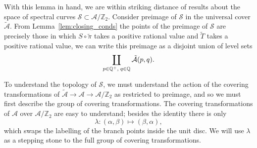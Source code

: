 \documentclass{article}
\begin{document}
With this lemma in hand, we are within striking distance of results about the space of spectral curves $\mathcal{S} \subset \mathcal{A}/\mathbb{Z}_2$. Consider preimage of $\mathcal{S}$ in the universal cover $\mathcal{\tilde{A}}$. From Lemma~\ref{lem:closing_conds} the points of the preimage of $\mathcal{S}$ are precisely those in which $S\circ\tilde{\pi}$ takes a positive rational value and $\tilde{T}$ takes a positive rational value, we can write this preimage as a disjoint union of level sets
\[
\coprod_{p\in \mathbb{Q}^+,\; q\in \mathbb{Q}} \mathcal{\tilde{A}}(p,q).
\]


To understand the topology of $\mathcal{S}$, we must understand the action of the covering transformations of $\mathcal{\tilde{A}} \to \mathcal{A} \to \mathcal{A}/\mathbb{Z}_2$ as restricted to preimage, and so we must first describe the group of covering transformations. The covering transformations of $\mathcal{A}$ over $\mathcal{A}/\mathbb{Z}_2$ are easy to understand; besides the identity there is only
\[
\lambda : (\alpha,\beta) \mapsto (\beta,\alpha),
\]
which swaps the labelling of the branch points inside the unit disc. We will use $\lambda$ as a stepping stone to the full group of covering transformations.


\end{document}

